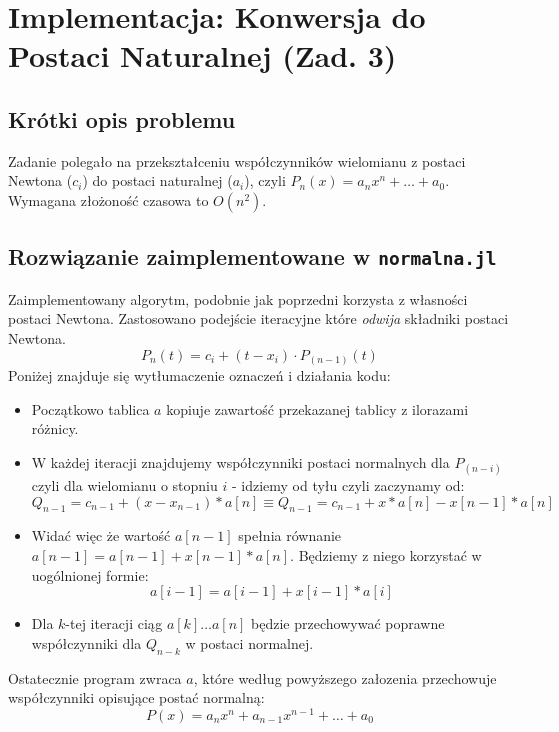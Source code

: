 \documentclass[11pt, a4paper]{article}
\begin{document}
	\section{Implementacja: Konwersja do Postaci Naturalnej (Zad. 3)}
	
	\subsection{Krótki opis problemu}
	Zadanie polegało na przekształceniu współczynników wielomianu z postaci Newtona ($c_i$) do postaci naturalnej ($a_i$), czyli $P_n(x) = a_n x^n + \dots + a_0$. Wymagana złożoność czasowa to $O(n^2)$.
	
	\subsection{Rozwiązanie zaimplementowane w \texttt{normalna.jl}}
	Zaimplementowany algorytm, podobnie jak poprzedni korzysta z własności postaci Newtona. Zastosowano podejście iteracyjne które \textit{odwija} składniki postaci Newtona.
	\begin{equation}
		P_n(t) = c_i + (t - x_i) \cdot P_(n-1)(t)
	\end{equation}
	Poniżej znajduje się wytłumaczenie oznaczeń i działania kodu:
	\begin{itemize}
		\item Początkowo tablica $a$ kopiuje zawartość przekazanej tablicy z ilorazami różnicy.
		\item W każdej iteracji znajdujemy współczynniki postaci normalnych dla $P_(n-i)$ czyli dla wielomianu o stopniu $i$ - idziemy od tyłu czyli zaczynamy od:
		\begin{equation}
			Q_{n-1} = c_{n-1} + (x-x_{n-1})*a[n]
			\equiv Q_{n-1} = c_{n-1} + x*a[n] - x[n-1]*a[n]
		\end{equation} 
		\item Widać więc że wartość $a[n-1]$ spełnia równanie $a[n-1] = a[n-1] + x[n-1]*a[n]$. Będziemy z niego korzystać w uogólnionej formie:
		\begin{equation}
			a[i-1] = a[i-1] + x[i-1] * a[i]
		\end{equation}
		\item Dla $k$-tej iteracji ciąg $a[k] \dots a[n]$ będzie przechowywać poprawne współczynniki dla $Q_{n-k}$ w postaci normalnej.
	\end{itemize}
	Ostatecznie program zwraca $a$, które według powyższego załozenia przechowuje współczynniki opisujące postać normalną:
	\begin{equation}
		P(x) = a_nx^n + a_{n-1}x^{n-1} + \dots + a_0
	\end{equation}
	
\end{document}
